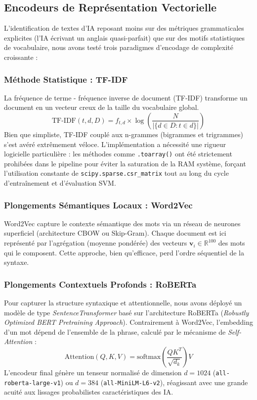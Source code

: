 \documentclass[11pt,a4paper]{article}
\begin{document}
\subsection{Encodeurs de Représentation Vectorielle}
L'identification de textes d'IA reposant moins sur des métriques grammaticales explicites (l'IA écrivant un anglais quasi-parfait) que sur des motifs statistiques de vocabulaire, nous avons testé trois paradigmes d'encodage de complexité croissante :

\subsubsection{Méthode Statistique : TF-IDF}
La fréquence de terme - fréquence inverse de document (TF-IDF) transforme un document en un vecteur creux de la taille du vocabulaire global.
\begin{equation}
    \text{TF-IDF}(t, d, D) = f_{t,d} \times \log\left(\frac{N}{|\{d \in D : t \in d\}|}\right)
\end{equation}
Bien que simpliste, TF-IDF couplé aux n-grammes (bigrammes et trigrammes) s'est avéré extrêmement véloce. L'implémentation a nécessité une rigueur logicielle particulière : les méthodes comme \texttt{.toarray()} ont été strictement prohibées dans le pipeline pour éviter la saturation de la RAM système, forçant l'utilisation constante de \texttt{scipy.sparse.csr\_matrix} tout au long du cycle d'entraînement et d'évaluation SVM.

\subsubsection{Plongements Sémantiques Locaux : Word2Vec}
Word2Vec capture le contexte sémantique des mots via un réseau de neurones superficiel (architecture CBOW ou Skip-Gram). Chaque document est ici représenté par l'agrégation (moyenne pondérée) des vecteurs $\mathbf{v}_i \in \mathbb{R}^{100}$ des mots qui le composent. Cette approche, bien qu'efficace, perd l'ordre séquentiel de la syntaxe.

\subsubsection{Plongements Contextuels Profonds : RoBERTa}
Pour capturer la structure syntaxique et attentionnelle, nous avons déployé un modèle de type \textit{SentenceTransformer} basé sur l'architecture RoBERTa (\textit{Robustly Optimized BERT Pretraining Approach}). Contrairement à Word2Vec, l'embedding d'un mot dépend de l'ensemble de la phrase, calculé par le mécanisme de \textit{Self-Attention} :
\begin{equation}
    \text{Attention}(Q, K, V) = \text{softmax}\left(\frac{QK^T}{\sqrt{d_k}}\right)V
\end{equation}
L'encodeur final génère un tenseur normalisé de dimension $d=1024$ (\texttt{all-roberta-large-v1}) ou $d=384$ (\texttt{all-MiniLM-L6-v2}), réagissant avec une grande acuité aux lissages probabilistes caractéristiques des IA.
\end{document}
